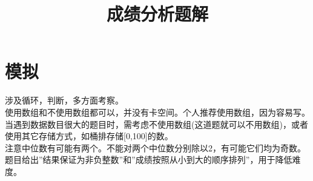 \documentclass{article}
\date{}
\title{成绩分析题解}
\begin{document}
		\maketitle \vspace{-50pt}
		
		\section{模拟}
			\indent 涉及循环，判断，多方面考察。\\
			\indent 使用数组和不使用数组都可以，并没有卡空间。个人推荐使用数组，因为容易写。当遇到数据数目很大的题目时，需考虑不使用数组(这道题就可以不用数组)，或者使用其它存储方式，如桶排存储[0,100]的数。\\
			\indent 注意中位数有可能有两个。不能对两个中位数分别除以2，有可能它们均为奇数。\\
			\indent 题目给出''结果保证为非负整数''和''成绩按照从小到大的顺序排列''，用于降低难度。
			
	
\end{document}

